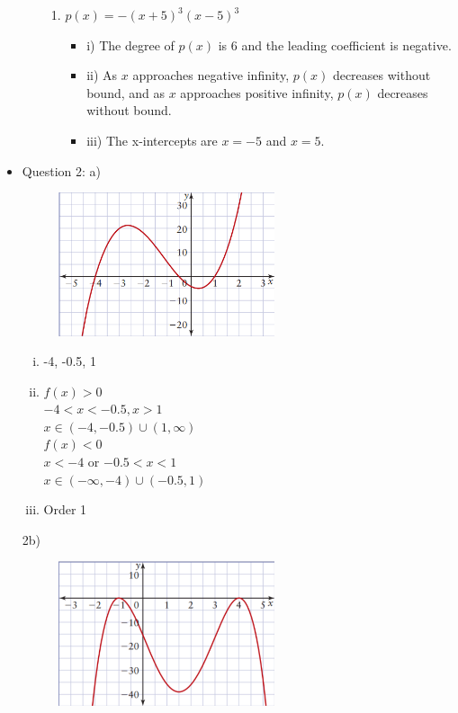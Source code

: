 \documentclass{article}
\begin{document}
\begin{itemize}
\begin{enumerate}
\begin{enumerate}
        \item $p(x) = -(x + 5)^3(x - 5)^3$
        \begin{itemize}
            \item i) The degree of $p(x)$ is 6 and the leading coefficient is negative.
            \item ii) As $x$ approaches negative infinity, $p(x)$ decreases without bound, and as $x$ approaches positive infinity, $p(x)$ decreases without bound.
            \item iii) The x-intercepts are $x = -5$ and $x = 5$.
        \end{itemize}
    \end{enumerate}
\end{enumerate}
\item Question 2:
a)
\begin{figure}[ht]
    \centering
    \includegraphics[width=0.6\textwidth]{imgs/ga.png}
\end{figure}

\begin{enumerate}[i.]
    \item -4, -0.5, 1
    \item $f(x)>0$\\$-4<x<-0.5, x>1$\\$x\in(-4,-0.5)\cup(1, \infty)$\\
          $f(x)<0$\\$x<-4$ or $-0.5<x<1$\\$x\in(-\infty,-4)\cup(-0.5, 1)$
    \item Order 1
\end{enumerate}
2b)
\begin{figure}[ht]
    \centering
    \includegraphics[width=0.6\textwidth]{imgs/gb.png}
\end{figure}


\end{itemize}
\end{document}
